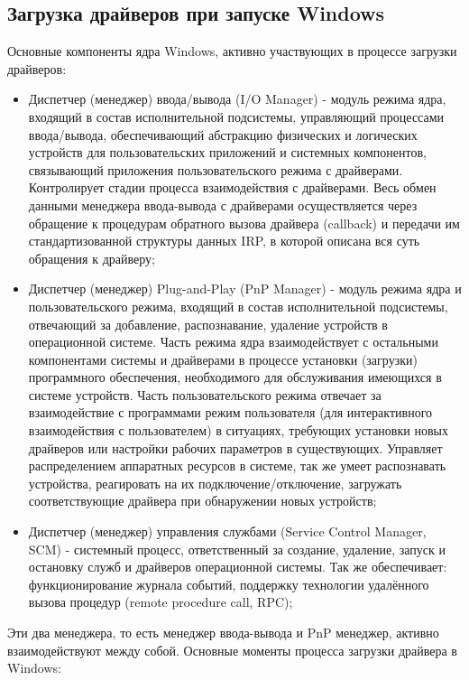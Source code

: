 \documentclass[14pt,a4paper]{article}
\begin{document}
\subsection{Загрузка драйверов при запуске Windows}
\par Основные компоненты ядра Windows, активно участвующих в процессе загрузки драйверов:
\begin{itemize}
    \item Диспетчер (менеджер) ввода/вывода (I/O Manager) - модуль режима ядра, входящий в состав исполнительной подсистемы, управляющий процессами ввода/вывода, обеспечивающий абстракцию физических и логических устройств для пользовательских приложений и системных компонентов, связывающий приложения пользовательского режима с драйверами. Контролирует стадии процесса взаимодействия с драйверами. Весь обмен данными менеджера ввода-вывода с драйверами осуществляется через обращение к процедурам обратного вызова драйвера (callback) и передачи им стандартизованной структуры данных IRP, в которой описана вся суть обращения к драйверу;
    \item Диспетчер (менеджер) Plug-and-Play (PnP Manager) - модуль режима ядра и пользовательского режима, входящий в состав исполнительной подсистемы, отвечающий за добавление, распознавание, удаление устройств в операционной системе. Часть режима ядра взаимодействует с остальными компонентами системы и драйверами в процессе установки (загрузки) программного обеспечения, необходимого для обслуживания имеющихся в системе устройств. Часть пользовательского режима отвечает за взаимодействие с программами режим пользователя (для интерактивного взаимодействия с пользователем) в ситуациях, требующих установки новых драйверов или настройки рабочих параметров в существующих. Управляет распределением аппаратных ресурсов в системе, так же умеет распознавать устройства, реагировать на их подключение/отключение, загружать соответствующие драйвера при обнаружении новых устройств;
    \item Диспетчер (менеджер) управления службами (Service Control Manager, SCM) - системный процесс, ответственный за создание, удаление, запуск и остановку служб и драйверов операционной системы. Так же обеспечивает: функционирование журнала событий, поддержку технологии удалённого вызова процедур (remote procedure call, RPC);
\end{itemize}

Эти два менеджера, то есть менеджер ввода-вывода и PnP менеджер, активно взаимодействуют между собой.
Основные моменты процесса загрузки драйвера в Windows:
\end{document}
